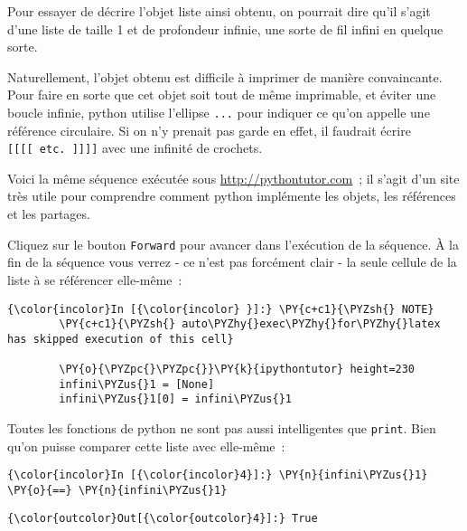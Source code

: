     Pour essayer de décrire l'objet liste ainsi obtenu, on pourrait dire
qu'il s'agit d'une liste de taille 1 et de profondeur infinie, une sorte
de fil infini en quelque sorte.

Naturellement, l'objet obtenu est difficile à imprimer de manière
convaincante. Pour faire en sorte que cet objet soit tout de même
imprimable, et éviter une boucle infinie, python utilise l'ellipse
\texttt{...} pour indiquer ce qu'on appelle une référence circulaire. Si
on n'y prenait pas garde en effet, il faudrait écrire
\texttt{{[}{[}{[}{[}\ etc.\ {]}{]}{]}{]}} avec une infinité de crochets.

    Voici la même séquence exécutée sous \url{http://pythontutor.com}~; il
s'agit d'un site très utile pour comprendre comment python implémente
les objets, les références et les partages.

Cliquez sur le bouton \texttt{Forward} pour avancer dans l'exécution de
la séquence. À la fin de la séquence vous verrez - ce n'est pas
forcément clair - la seule cellule de la liste à se référencer
elle-même~:

    \begin{Verbatim}[commandchars=\\\{\},frame=single,framerule=0.3mm,rulecolor=\color{cellframecolor}]
{\color{incolor}In [{\color{incolor} }]:} \PY{c+c1}{\PYZsh{} NOTE}
        \PY{c+c1}{\PYZsh{} auto\PYZhy{}exec\PYZhy{}for\PYZhy{}latex has skipped execution of this cell}
        
        \PY{o}{\PYZpc{}\PYZpc{}}\PY{k}{ipythontutor} height=230
        infini\PYZus{}1 = [None]
        infini\PYZus{}1[0] = infini\PYZus{}1
\end{Verbatim}


    Toutes les fonctions de python ne sont pas aussi intelligentes que
\texttt{print}. Bien qu'on puisse comparer cette liste avec elle-même~:

    \begin{Verbatim}[commandchars=\\\{\},frame=single,framerule=0.3mm,rulecolor=\color{cellframecolor}]
{\color{incolor}In [{\color{incolor}4}]:} \PY{n}{infini\PYZus{}1} \PY{o}{==} \PY{n}{infini\PYZus{}1}
\end{Verbatim}


\begin{Verbatim}[commandchars=\\\{\},frame=single,framerule=0.3mm,rulecolor=\color{cellframecolor}]
{\color{outcolor}Out[{\color{outcolor}4}]:} True
\end{Verbatim}
            
